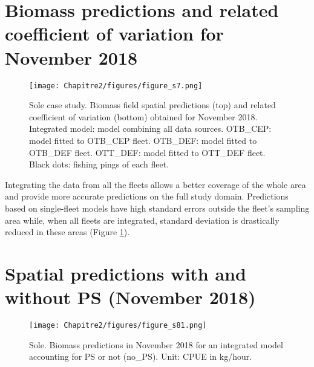 \section{Biomass predictions and related coefficient of variation for November 2018}\label{appendix:BiomassPred}

\begin{figure}[H]
   \begin{center}
      \texttt{[image: Chapitre2/figures/figure\_s7.png]}
   \end{center}
   \caption[Sole case study. Biomass field spatial predictions (top) and related coefficient of variation (bottom) obtained for November 2018.]
   {Sole case study. Biomass field spatial predictions (top) and related coefficient of variation (bottom) obtained for November 2018. Integrated model: model combining all data sources. OTB_CEP: model fitted to OTB_CEP fleet. OTB_DEF: model fitted to OTB_DEF fleet. OTT_DEF: model fitted to OTT_DEF fleet. Black dots: fishing pings of each fleet.}
   \label{fig:Chap2FigS7}
\end{figure}

Integrating the data from all the fleets allows a better coverage of the whole area and provide more accurate predictions on the full study domain. Predictions based on single-fleet models have high standard errors outside the fleet’s sampling area while, when all fleets are integrated, standard deviation is drastically reduced in these areas (Figure \ref{fig:Chap2FigS7}).

\newpage

\section{Spatial predictions with and without PS (November 2018)}\label{appendix:PredWithPSandWithout}

\begin{figure}[H]
   \begin{center}
      \texttt{[image: Chapitre2/figures/figure\_s81.png]}
   \end{center}
   \caption[Sole. Biomass predictions in November 2018 for an integrated model accounting for PS or not (no_PS).]
   {Sole. Biomass predictions in November 2018 for an integrated model accounting for PS or not (no_PS). Unit: CPUE in kg/hour.}
   \label{fig:Chap2FigS81}
\end{figure}

\newpage

